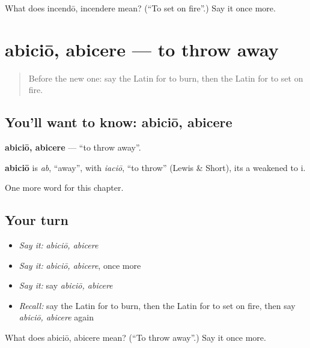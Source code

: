 \begin{tcolorbox}[breakable,colback=teal!4,colframe=teal!35!black,title={Before you move on}]
What does incendō, incendere mean? (\textquotedblleft{}To set on fire\textquotedblright{}.) Say it once more.
\end{tcolorbox}
\section[abiciō, abicere]{abiciō, abicere — to throw away}

\label{lesson:LA-C167-abicio}



\begin{quote}
Before the new one: say the Latin for to burn, then the Latin for to set on fire.
\end{quote}

\subsection*{You'll want to know: abiciō, abicere}
\textbf{abiciō, abicere} — \textquotedblleft{}to throw away\textquotedblright{}.

\begin{cousinweb}
\textbf{abiciō} is \emph{ab}, \textquotedblleft{}away\textquotedblright{}, with \emph{iaciō}, \textquotedblleft{}to throw\textquotedblright{} (Lewis \& Short), its a weakened to i.
\end{cousinweb}

\begin{grammarlens}[title={What you've built}]
One more word for this chapter.
\end{grammarlens}

\subsection*{Your turn}
\begin{itemize}
\raggedright
  \item \emph{Say it:} \emph{abiciō, abicere}
  \item \emph{Say it:} \emph{abiciō, abicere}, once more
  \item \emph{Say it:} say \emph{abiciō, abicere}
  \item \emph{Recall:} say the Latin for to burn, then the Latin for to set on fire, then say \emph{abiciō, abicere} again
\end{itemize}

\begin{tcolorbox}[breakable,colback=teal!4,colframe=teal!35!black,title={Before you move on}]
What does abiciō, abicere mean? (\textquotedblleft{}To throw away\textquotedblright{}.) Say it once more.
\end{tcolorbox}
